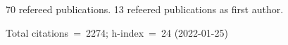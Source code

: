70 refereed publications. 13 refeered publications as first author.

Total citations~=~2274; h-index~=~24 (2022-01-25)